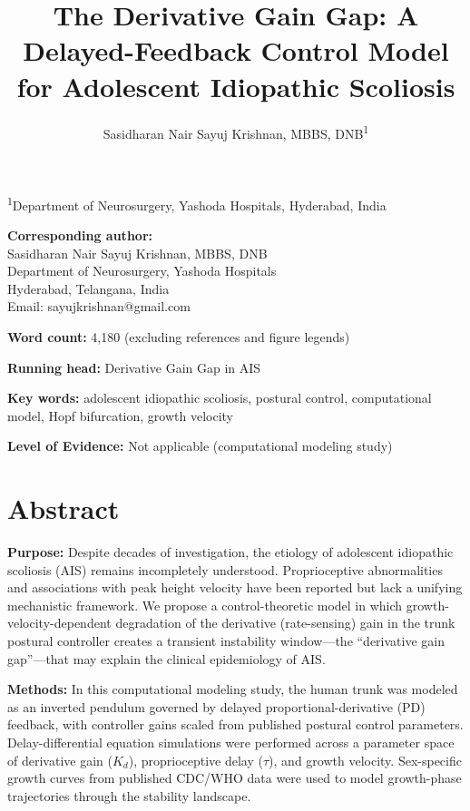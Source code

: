 \documentclass[12pt,a4paper]{article}
\title{\textbf{The Derivative Gain Gap: A Delayed-Feedback Control Model\\for Adolescent Idiopathic Scoliosis}}
\author{
  Sasidharan Nair Sayuj Krishnan, MBBS, DNB\textsuperscript{1}
}
\date{}
\begin{document}
\maketitle

\noindent\textsuperscript{1}Department of Neurosurgery, Yashoda Hospitals, Hyderabad, India

\bigskip
\noindent\textbf{Corresponding author:}\\
Sasidharan Nair Sayuj Krishnan, MBBS, DNB\\
Department of Neurosurgery, Yashoda Hospitals\\
Hyderabad, Telangana, India\\
Email: sayujkrishnan@gmail.com

\bigskip
\noindent\textbf{Word count:} 4,180 (excluding references and figure legends)

\bigskip
\noindent\textbf{Running head:} Derivative Gain Gap in AIS

\bigskip
\noindent\textbf{Key words:} adolescent idiopathic scoliosis, postural control, computational model, Hopf bifurcation, growth velocity

\bigskip
\noindent\textbf{Level of Evidence:} Not applicable (computational modeling study)

\newpage

\section*{Abstract}

\noindent\textbf{Purpose:}
Despite decades of investigation, the etiology of adolescent idiopathic scoliosis (AIS) remains incompletely understood. Proprioceptive abnormalities and associations with peak height velocity have been reported but lack a unifying mechanistic framework. We propose a control-theoretic model in which growth-velocity-dependent degradation of the derivative (rate-sensing) gain in the trunk postural controller creates a transient instability window---the ``derivative gain gap''---that may explain the clinical epidemiology of AIS.

\noindent\textbf{Methods:}
In this computational modeling study, the human trunk was modeled as an inverted pendulum governed by delayed proportional-derivative (PD) feedback, with controller gains scaled from published postural control parameters. Delay-differential equation simulations were performed across a parameter space of derivative gain ($K_d$), proprioceptive delay ($\tau$), and growth velocity. Sex-specific growth curves from published CDC/WHO data were used to model growth-phase trajectories through the stability landscape.
\end{document}
